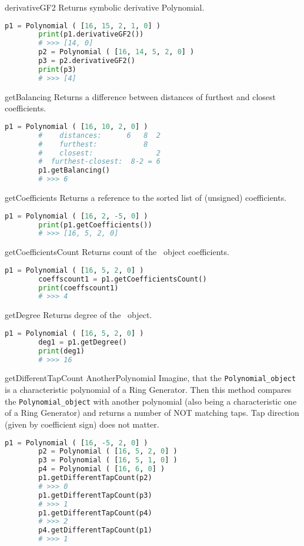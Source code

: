  {derivativeGF2} {} {
	Returns symbolic derivative Polynomial.
}
\begin{lstlisting}[language=Python]
		p1 = Polynomial ( [16, 15, 2, 1, 0] )
		print(p1.derivativeGF2())
		# >>> [14, 0]
		p2 = Polynomial ( [16, 14, 5, 2, 0] )
		p3 = p2.derivativeGF2()
		print(p3)
		# >>> [4]
\end{lstlisting}

 {getBalancing} {} {
	Returns a difference between distances of furthest and closest coefficients.
}
\begin{lstlisting}[language=Python]
		p1 = Polynomial ( [16, 10, 2, 0] )
		#    distances:      6   8  2
		#    furthest:           8
		#    closest:               2
		#  furthest-closest:  8-2 = 6
		p1.getBalancing()
		# >>> 6
\end{lstlisting}

 {getCoefficients} {} {
	Returns a reference to the sorted list of (unsigned) coefficients.
}
\begin{lstlisting}[language=Python]
		p1 = Polynomial ( [16, 2, -5, 0] )
		print(p1.getCoefficients())
		# >>> [16, 5, 2, 0]
\end{lstlisting}

 {getCoefficientsCount} {} {
	Returns count of the \Polynomial\ object coefficients.
}
\begin{lstlisting}[language=Python]
		p1 = Polynomial ( [16, 5, 2, 0] )
		coeffscount1 = p1.getCoefficientsCount()
		print(coeffscount1)
		# >>> 4
\end{lstlisting}

 {getDegree} {} {
	Returns degree of the \Polynomial\ object.
}
\begin{lstlisting}[language=Python]
		p1 = Polynomial ( [16, 5, 2, 0] )
		deg1 = p1.getDegree()
		print(deg1)
		# >>> 16
\end{lstlisting}

 {getDifferentTapCount} {AnotherPolynomial} {
	Imagine, that the \texttt{Polynomial\_object} is a characteristic polynomial of a Ring Generator. Then this method compares the \texttt{Polynomial\_object} with another polynomial (also being a characteristic one of a Ring Generator) and returns a number of NOT matching taps. Tap direction (given by coefficient sign) does not matter.
}
\begin{lstlisting}[language=Python]
		p1 = Polynomial ( [16, -5, 2, 0] )
		p2 = Polynomial ( [16, 5, 2, 0] )
		p3 = Polynomial ( [16, 5, 1, 0] )
		p4 = Polynomial ( [16, 6, 0] )
		p1.getDifferentTapCount(p2)
		# >>> 0
		p1.getDifferentTapCount(p3)
		# >>> 1
		p1.getDifferentTapCount(p4)
		# >>> 2
		p4.getDifferentTapCount(p1)
		# >>> 1
\end{lstlisting}


